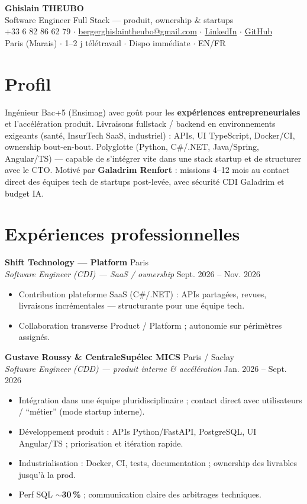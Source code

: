 \documentclass[10pt,a4paper]{article}
\begin{document}
\begin{center}
{\LARGE\bfseries Ghislain THEUBO}\\[2pt]
{\large Software Engineer Full Stack --- produit, ownership \& startups}\\[3pt]
+33 6 82 86 62 79 $\cdot$
\href{mailto:bergerghislaintheubo@gmail.com}{bergerghislaintheubo@gmail.com} $\cdot$
\href{https://www.linkedin.com/in/berger-ghislain}{LinkedIn} $\cdot$
\href{https://github.com/Bergerghislain}{GitHub}\\[1pt]
Paris (Marais) $\cdot$ 1--2 j t\'el\'etravail $\cdot$ Dispo imm\'ediate $\cdot$ EN/FR
\end{center}

\section{Profil}
Ing\'enieur Bac+5 (Ensimag) avec go\^ut pour les \textbf{exp\'eriences entrepreneuriales} et l'acc\'el\'eration produit. Livraisons fullstack / backend en environnements exigeants (sant\'e, InsurTech SaaS, industriel) : APIs, UI TypeScript, Docker/CI, ownership bout-en-bout. Polyglotte (Python, C\#/.NET, Java/Spring, Angular/TS) --- capable de s'int\'egrer vite dans une stack startup et de structurer avec le CTO. Motiv\'e par \textbf{Galadrim Renfort} : missions 4--12 mois au contact direct des \'equipes tech de startups post-lev\'ee, avec s\'ecurit\'e CDI Galadrim et budget IA.

\section{Exp\'eriences professionnelles}
\textbf{Shift Technology --- Platform} \hfill Paris\\
\textit{Software Engineer (CDI) --- SaaS / ownership} \hfill Sept. 2026 -- Nov. 2026
\begin{itemize}
  \item Contribution plateforme SaaS (C\#/.NET) : APIs partag\'ees, revues, livraisons incr\'ementales --- structurante pour une \'equipe tech.
  \item Collaboration transverse Product / Platform ; autonomie sur p\'erim\`etres assign\'es.
\end{itemize}

\textbf{Gustave Roussy \& CentraleSup\'elec MICS} \hfill Paris / Saclay\\
\textit{Software Engineer (CDD) --- produit interne \& acc\'el\'eration} \hfill Jan. 2026 -- Sept. 2026
\begin{itemize}
  \item Int\'egration dans une \'equipe pluridisciplinaire ; contact direct avec utilisateurs / ``m\'etier'' (mode startup interne).
  \item D\'eveloppement produit : APIs Python/FastAPI, PostgreSQL, UI Angular/TS ; priorisation et it\'eration rapide.
  \item Industrialisation : Docker, CI, tests, documentation ; ownership des livrables jusqu'\`a la prod.
  \item Perf SQL $\sim$\textbf{30\,\%} ; communication claire des arbitrages techniques.
\end{itemize}
\end{document}
